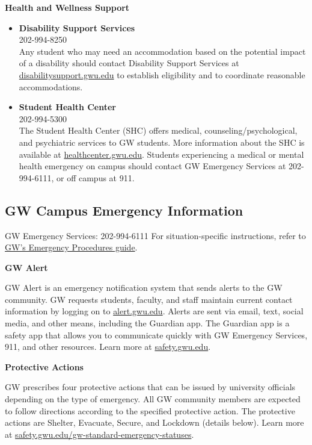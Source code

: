 \documentclass[12pt,letterpaper]{article}
\begin{document}
\textbf{Health and Wellness Support}

\begin{itemize}
    \item \textbf{Disability Support Services} \\
    202-994-8250 \\
    Any student who may need an accommodation based on the potential impact of a disability should contact Disability Support Services at \href{https://disabilitysupport.gwu.edu}{disabilitysupport.gwu.edu} to establish eligibility and to coordinate reasonable accommodations.
    \item \textbf{Student Health Center} \\
    202-994-5300\\
    The Student Health Center (SHC) offers medical, counseling/psychological, and psychiatric services to GW students. More information about the SHC is available at \href{https://healthcenter.gwu.edu}{healthcenter.gwu.edu}. Students experiencing a medical or mental health emergency on campus should contact GW Emergency Services at 202-994-6111, or off campus at 911.
\end{itemize}
\vspace{-.5em}

\subsection*{GW Campus Emergency Information}
GW Emergency Services: 202-994-6111
For situation-specific instructions, refer to \href{https://safety.gwu.edu/emergency-response-handbook}{GW's Emergency Procedures guide}.

\textbf{GW Alert}

GW Alert is an emergency notification system that sends alerts to the GW community. GW requests students, faculty, and staff maintain current contact information by logging on to \href{https://alert.gwu.edu}{alert.gwu.edu}. Alerts are sent via email, text, social media, and other means, including the Guardian app. The Guardian app is a safety app that allows you to communicate quickly with GW Emergency Services, 911, and other resources. Learn more at \href{https://safety.gwu.edu}{safety.gwu.edu}.

\textbf{Protective Actions} 

GW prescribes four protective actions that can be issued by university officials depending on the type of emergency. All GW community members are expected to follow directions according to the specified protective action. The protective actions are Shelter, Evacuate, Secure, and Lockdown (details below). Learn more at \href{https://safety.gwu.edu/gw-standard-emergency-statuses}{safety.gwu.edu/gw-standard-emergency-statuses}.
\end{document}
